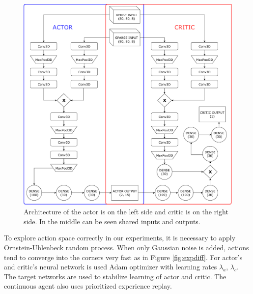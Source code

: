 \begin{figure}[!h]
\centering
\includegraphics[scale=0.55]{fig/ddpg.pdf}
\caption[DDPG architecture]{Architecture of the actor is on the left side and critic is on the right side. In the middle can be seen shared inputs and outputs.}
\label{fig:ddpg}
\end{figure}

\pagebreak
To explore action space correctly in our experiments, it is necessary to apply Ornstein-Uhlenbeck random process. When only Gaussian noise is added, actions tend to converge into the corners very fast as in Figure \ref{fig:expdiff}. For actor's and critic's neural network is used Adam optimizer with learning rates $\lambda_{a}$, $\lambda_{c}$. The target networks are used to stabilize learning of actor and critic. The continuous agent also uses prioritized experience replay.

